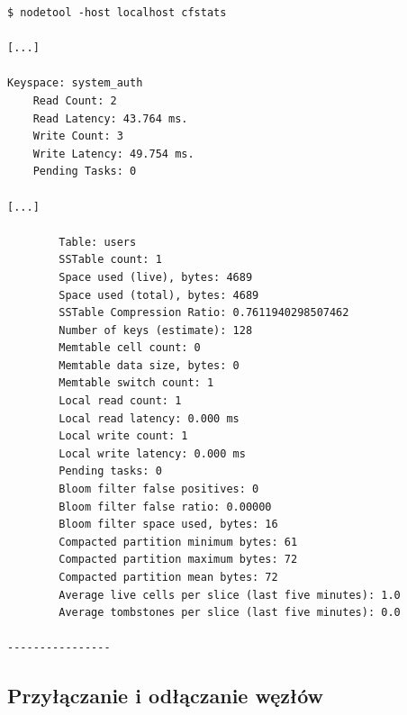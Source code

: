 \documentclass{article} %
\begin{document}
\begin{lstlisting}[style=bash, caption={statystyki dla przestrzeni kluczy \texttt{system\_auth}}]
$ nodetool -host localhost cfstats

[...]

Keyspace: system_auth
	Read Count: 2
	Read Latency: 43.764 ms.
	Write Count: 3
	Write Latency: 49.754 ms.
	Pending Tasks: 0

[...]

		Table: users
		SSTable count: 1
		Space used (live), bytes: 4689
		Space used (total), bytes: 4689
		SSTable Compression Ratio: 0.7611940298507462
		Number of keys (estimate): 128
		Memtable cell count: 0
		Memtable data size, bytes: 0
		Memtable switch count: 1
		Local read count: 1
		Local read latency: 0.000 ms
		Local write count: 1
		Local write latency: 0.000 ms
		Pending tasks: 0
		Bloom filter false positives: 0
		Bloom filter false ratio: 0.00000
		Bloom filter space used, bytes: 16
		Compacted partition minimum bytes: 61
		Compacted partition maximum bytes: 72
		Compacted partition mean bytes: 72
		Average live cells per slice (last five minutes): 1.0
		Average tombstones per slice (last five minutes): 0.0

----------------
\end{lstlisting}

\subsection{Przyłączanie i odłączanie węzłów}\label{sec:management_nodepool}



\pagebreak
\end{document}
